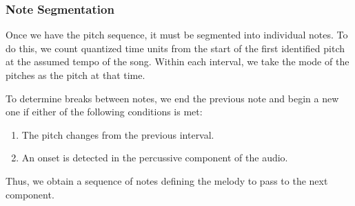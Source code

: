 \subsubsection{Note Segmentation}

Once we have the pitch sequence, it must be segmented into individual notes. To do this, we count quantized time units from the start of the first identified pitch at the assumed tempo of the song. Within each interval, we take the mode of the pitches as the pitch at that time.

To determine breaks between notes, we end the previous note and begin a new one if either of the following conditions is met:

\begin{enumerate}
    \item The pitch changes from the previous interval.
    \item An onset is detected in the percussive component of the audio.
\end{enumerate}

Thus, we obtain a sequence of notes defining the melody to pass to the next component.
